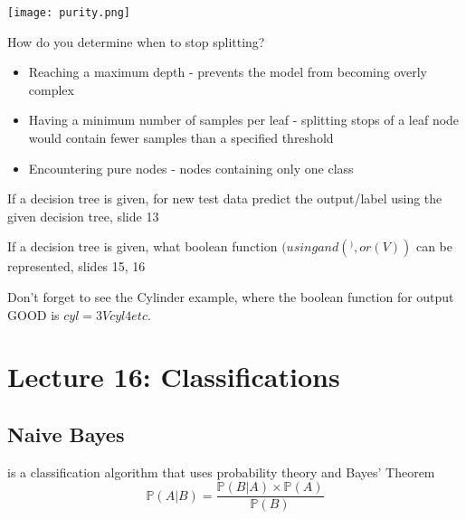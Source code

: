 \documentclass[12pt]{scrartcl}
\newcommand{\PP}{\mathbb{P}}
\begin{document}
\begin{center}
  \texttt{[image: purity.png]}
\end{center}

\begin{note}
  How do you determine when to stop splitting?

  \begin{itemize}
    \item Reaching a maximum depth - prevents the model from becoming overly complex
    \item Having a minimum number of samples per leaf - splitting stops of a leaf node would contain fewer samples than a specified threshold
    \item Encountering pure nodes - nodes containing only one class
  \end{itemize}
\end{note}

If a decision tree is given, for new test data predict the output/label using the given decision tree, slide 13

If a decision tree is given, what boolean function $(using and (^), or (V) )$ can be represented, slides 15, 16

Don't forget to see the Cylinder example, where the boolean function for output GOOD is $cyl=3 V cyl 4  etc.$

\section{Lecture 16: Classifications}

\subsection{Naive Bayes}

\begin{definition}
   is a classification algorithm that uses probability 
  theory and Bayes' Theorem
  \[\PP(A | B) = \frac{\PP(B | A) \times \PP(A)}{\PP(B)}\]
\end{definition}
\end{document}

